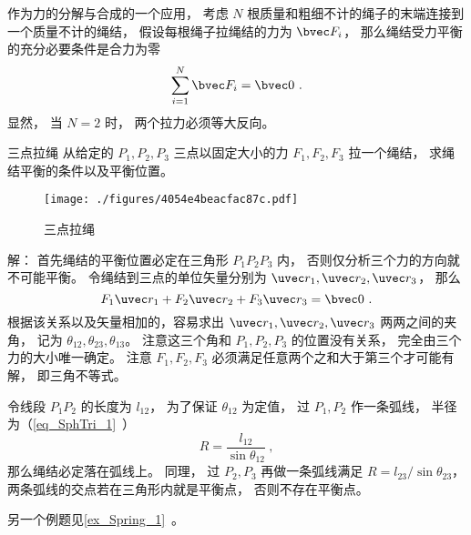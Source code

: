 

作为力的分解与合成的一个应用， 考虑 $N$ 根质量和粗细不计的绳子的末端连接到一个质量不计的绳结， 假设每根绳子拉绳结的力为 $\bvec F_i$， 那么绳结受力平衡的充分必要条件是合力为零
\begin{equation}
\sum_{i=1}^N \bvec F_i = \bvec 0~.
\end{equation}
显然， 当 $N = 2$ 时， 两个拉力必须等大反向。

\begin{example}{三点拉绳}
从给定的 $P_1,P_2,P_3$ 三点以固定大小的力 $F_1, F_2, F_3$ 拉一个绳结， 求绳结平衡的条件以及平衡位置。
\begin{figure}[ht]
\centering
\texttt{[image: ./figures/4054e4beacfac87c.pdf]}
\caption{三点拉绳} \label{fig_Knot_1}
\end{figure}

解： 首先绳结的平衡位置必定在三角形 $P_1 P_2 P_3$ 内， 否则仅分析三个力的方向就不可能平衡。 令绳结到三点的单位矢量分别为 $\uvec r_1, \uvec r_2, \uvec r_3$， 那么
\begin{equation}
F_1 \uvec r_1 + F_2 \uvec r_2 + F_3 \uvec r_3 = \bvec 0~.
\end{equation}
根据该关系以及矢量相加的，容易求出 $\uvec r_1, \uvec r_2, \uvec r_3$ 两两之间的夹角， 记为 $\theta_{12}, \theta_{23}, \theta_{13}$。 注意这三个角和 $P_1, P_2, P_3$ 的位置没有关系， 完全由三个力的大小唯一确定。 注意 $F_1, F_2, F_3$ 必须满足任意两个之和大于第三个才可能有解， 即三角不等式。

令线段 $P_1P_2$ 的长度为 $l_{12}$， 为了保证 $\theta_{12}$ 为定值， 过 $P_1, P_2$ 作一条弧线， 半径为（\autoref{eq_SphTri_1}~）
\begin{equation}
R = \frac{l_{12}}{\sin\theta_{12}}~,
\end{equation}
那么绳结必定落在弧线上。 同理， 过 $P_2, P_3$ 再做一条弧线满足 $R = l_{23}/\sin\theta_{23}$， 两条弧线的交点若在三角形内就是平衡点， 否则不存在平衡点。
\end{example}

另一个例题见\autoref{ex_Spring_1}~。
